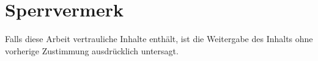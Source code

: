 \chapter*{Sperrvermerk}
Falls diese Arbeit vertrauliche Inhalte enthält, ist die Weitergabe des Inhalts
ohne vorherige Zustimmung ausdrücklich untersagt.
